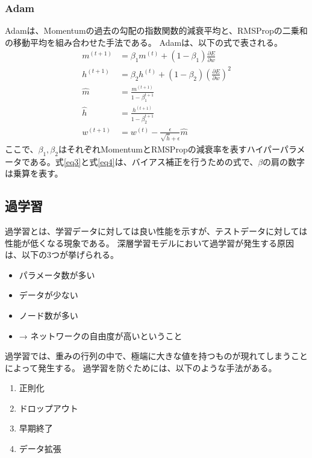 \documentclass{ltjsarticle}
\begin{document}
\subsubsection{Adam}
Adamは、Momentumの過去の勾配の指数関数的減衰平均と、RMSPropの二乗和の移動平均を組み合わせた手法である。
Adamは、以下の式で表される。
\begin{align}
  m^{(t+1)} &= \beta_1 m^{(t)} + (1 - \beta_1) \frac{\partial E}{\partial w} \\
  h^{(t+1)} &= \beta_2 h^{(t)} + (1 - \beta_2) \left( \frac{\partial E}{\partial w} \right)^2 \\
  \label{eq3}
  \hat{m} &= \frac{m^{(t+1)}}{1 - \beta_1^{t+1}} \\
  \label{eq4}
  \hat{h} &= \frac{h^{(t+1)}}{1 - \beta_2^{t+1}} \\
  w^{(t+1)} &= w^{(t)} - \frac{\epsilon}{\sqrt{\hat{h}} + \epsilon} \hat{m}
\end{align}
ここで、$\beta_1, \beta_2$はそれぞれMomentumとRMSPropの減衰率を表すハイパーパラメータである。式\eqref{eq3}と式\eqref{eq4}は、バイアス補正を行うための式で、$\beta$の肩の数字は乗算を表す。


\subsection{過学習}
過学習とは、学習データに対しては良い性能を示すが、テストデータに対しては性能が低くなる現象である。
深層学習モデルにおいて過学習が発生する原因は、以下の3つが挙げられる。
\begin{itemize}
  \item パラメータ数が多い
  \item データが少ない
  \item ノード数が多い
  \item → ネットワークの自由度が高いということ
\end{itemize}
過学習では、重みの行列の中で、極端に大きな値を持つものが現れてしまうことによって発生する。
過学習を防ぐためには、以下のような手法がある。
\begin{enumerate}
  \item 正則化
  \item ドロップアウト
  \item 早期終了
  \item データ拡張
\end{enumerate}
\end{document}
